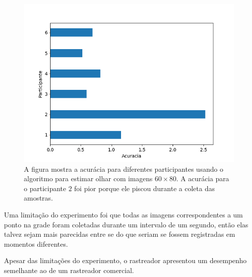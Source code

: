 \begin{figure}
    \centering
    \includegraphics[scale=.6]{imagens/errosParticipantes_pyrDown3.png}
    \caption{A figura mostra a acurácia para diferentes participantes usando o algoritmo para estimar olhar com imagens $60 \times 80$. A acurácia para o participante $2$ foi pior porque ele piscou durante a coleta das amostras.}
    \label{fig:erros_participante}
\end{figure}

Uma limitação do experimento foi que todas as imagens correspondentes a um ponto na grade foram coletadas durante um intervalo de um segundo, então elas talvez sejam mais parecidas entre se do que seriam se fossem registradas em momentos diferentes.

Apesar das limitações do experimento, o rastreador apresentou um desempenho semelhante ao de um rastreador comercial.